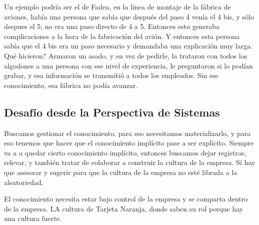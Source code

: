 Un ejemplo podría ser el de Fadea, en la línea de montaje de la fábrica
de aviones, había una persona que sabía que después del paso 4 venía el
4 bis, y sólo despues el 5, no era una paso directo de 4 a 5. Entonces
esto generaba complicaciones a la hora de la fabricación del avión. Y
entonces esta persona sabía que el 4 bis era un paso necesario y
demandaba una explicación muy larga. Qué hicieron? Armaron un asado, y
en vez de pedirle, la trataron con todos los algodones a una persona con
ese nivel de experiencia, le preguntaron si lo podían grabar, y esa
información se transmitió a todos los empleados. Sin ese conocimiento,
esa fábrica no podía avanzar.

\hypertarget{desafuxedo-desde-la-perspectiva-de-sistemas}{%
\subsection{Desafío desde la Perspectiva de
Sistemas}\label{desafuxedo-desde-la-perspectiva-de-sistemas}}

Buscamos gestionar el conocimiento, para eso necesitamos materializarlo,
y para eso tenemos que hacer que el conocimiento implícito pase a ser
explícito. Siempre va a a quedar cierto conocimiento implícito, entonces
buscamos dejar registros, relevar, y también tratar de colaborar a
construir la cultura de la empresa. Sí hay que asesorar y sugerir para
que la cultura de la empresa no esté librada a la aleatoriedad.

El conocimiento necesita estar bajo control de la empresa y se comparta
dentro de la empresa. LA cultura de Tarjeta Naranja, donde saben su rol
porque hay una cultura fuerte.
